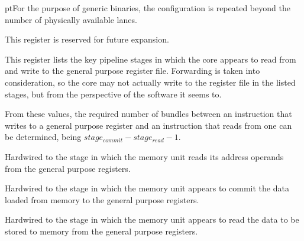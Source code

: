  pt\noindent For the purpose of generic binaries, the configuration is 
repeated beyond the number of physically available lanes.

\implementation{}


This register is reserved for future expansion.


This register lists the key pipeline stages in which the core appears to read
from and write to the general purpose register file. Forwarding is taken into
consideration, so the core may not actually write to the register file in the
listed stages, but from the perspective of the software it seems to.

From these values, the required number of bundles between an instruction that
writes to a general purpose register and an instruction that reads from one can
be determined, being $stage_{commit} - stage_{read} - 1$.

\reset{****}
Hardwired to the stage in which the memory unit reads its address operands from
the general purpose registers.

\implementation{}

\reset{****}
Hardwired to the stage in which the memory unit appears to commit the data
loaded from memory to the general purpose registers.

\implementation{}

\reset{****}
Hardwired to the stage in which the memory unit appears to read the data to be
stored to memory from the general purpose registers.

